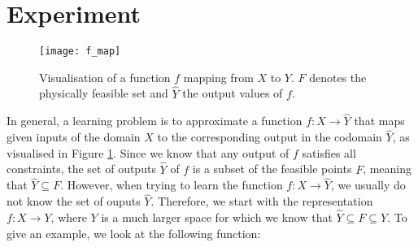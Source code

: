 \label{section:experiment}
\section{Experiment}
\begin{figure}[H]
	\texttt{[image: f\_map]}
	\caption{Visualisation of a function $f$ mapping from $X$ to $Y$. $F$ denotes the physically feasible set and $\hat{Y}$ the output values of $f$.}
	\label{fig:f_map}
\end{figure}
In general, a learning problem is to approximate a function $f: X \to \hat{Y}$ that maps given inputs of the domain $X$ to the corresponding output in the codomain $\hat{Y}$, as visualised in Figure \ref{fig:f_map}. Since we know that any output of $f$ satisfies all constraints, the set of outputs $\hat{Y}$ of $f$ is a subset of the feasible points $F$, meaning that $\hat{Y} \subseteq F$. However, when trying to learn the function $f: X \to \hat{Y}$, we usually do not know the set of ouputs $\hat{Y}$. Therefore, we start with the representation $f: X \to Y$, where $Y$ is a much larger space for which we know that $\hat{Y} \subseteq F \subseteq Y$. To give an example, we look at the following function:

